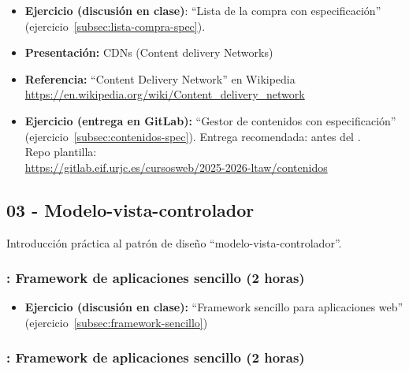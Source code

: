 \documentclass[a4paper,12pt]{article}
\begin{document}
\begin{itemize}
\item \textbf{Ejercicio (discusión en clase)}: ``Lista de la compra con especificación'' (ejercicio~\ref{subsec:lista-compra-spec}).

\item \textbf{Presentación:} CDNs (Content delivery Networks)
\item \textbf{Referencia:} ``Content Delivery Network'' en Wikipedia \\ \url{https://en.wikipedia.org/wiki/Content_delivery_network}
\item \textbf{Ejercicio (entrega en GitLab):} ``Gestor de contenidos con especificación'' (ejercicio~\ref{subsec:contenidos-spec}).
  Entrega recomendada: antes del \martesH. \\
  Repo plantilla: \\ {\footnotesize \url{https://gitlab.eif.urjc.es/cursosweb/2025-2026-ltaw/contenidos}}
\end{itemize}


\subsection{03 - Modelo-vista-controlador}

Introducción práctica al patrón de diseño ``modelo-vista-controlador''.

\subsubsection{\lunesH: Framework de aplicaciones sencillo (2 horas)}
\label{cal:lunesH}

\begin{itemize}
  \item \textbf{Ejercicio (discusión en clase):} ``Framework sencillo para aplicaciones web'' (ejercicio~\ref{subsec:framework-sencillo})
\end{itemize}

\subsubsection{\martesH: Framework de aplicaciones sencillo (2 horas)}
\label{cal:martesH}
\end{document}
